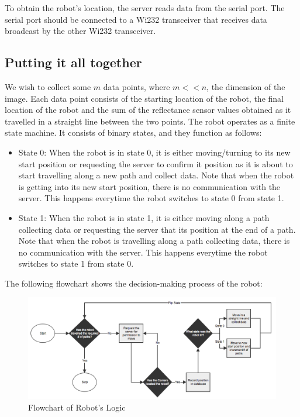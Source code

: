 \documentclass[english]{article}\usepackage[]{graphicx}\usepackage[]{color}
\begin{document}
To obtain the robot's location, the server reads data from the serial port. The serial port should be connected to a Wi232 transceiver that receives data broadcast by the other Wi232 transceiver.

\subsection{Putting it all together}

We wish to collect some $m$ data points, where $m << n$, the dimension of the image. Each data point consists of the starting location of the robot, the final location of the robot and the sum of the reflectance sensor values obtained as it travelled in a straight line between the two points. The robot operates as a finite state machine. It consists of binary states, and they function as follows:
\begin{itemize}
\item State 0: When the robot is in state 0, it is either moving/turning to its new start position or requesting the server to confirm it position as it is about to start travelling along a new path and collect data. Note that when the robot is getting into its new start position, there is no communication with the server. This happens everytime the robot switches to state 0 from state 1.
\item State 1: When the robot is in state 1, it is either moving along a path collecting data or requesting the server that its position at the end of a path. Note that when the robot is travelling along a path collecting data, there is no communication with the server. This happens everytime the robot switches to state 1 from state 0.
\end{itemize}
The following flowchart shows the decision-making process of the robot:
\begin{figure}[H]
\begin{centering}

\includegraphics[width=1\linewidth]{figures/robot_flowchart}
\end{centering}

\caption{Flowchart of Robot's Logic}
\label{fig:robot-flowchart}
\end{figure}
\end{document}
